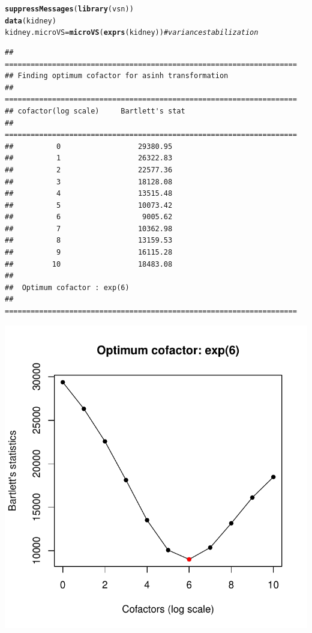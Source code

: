\documentclass{article}\usepackage[]{graphicx}\usepackage[]{color}
\makeatletter
\def\maxwidth{ %
  \ifdim\Gin@nat@width>\linewidth
    \linewidth
  \else
    \Gin@nat@width
  \fi
}
\newcommand{\hlcom}[1]{\textcolor[rgb]{0.678,0.584,0.686}{\textit{#1}}}%
\newcommand{\hlstd}[1]{\textcolor[rgb]{0.345,0.345,0.345}{#1}}%
\newcommand{\hlkwb}[1]{\textcolor[rgb]{0.69,0.353,0.396}{#1}}%
\newcommand{\hlkwd}[1]{\textcolor[rgb]{0.737,0.353,0.396}{\textbf{#1}}}%
\newenvironment{kframe}{%
 \def\at@end@of@kframe{}%
 \ifinner\ifhmode%
  \def\at@end@of@kframe{\end{minipage}}%
  \begin{minipage}{\columnwidth}%
 \fi\fi%
 \def\FrameCommand##1{\hskip\@totalleftmargin \hskip-\fboxsep
 \colorbox{shadecolor}{##1}\hskip-\fboxsep
     \hskip-\linewidth \hskip-\@totalleftmargin \hskip\columnwidth}%
 \MakeFramed {\advance\hsize-\width
   \@totalleftmargin\z@ \linewidth\hsize
   \@setminipage}}%
 {\par\unskip\endMakeFramed%
 \at@end@of@kframe}
\newenvironment{knitrout}{}{} %
\makeatother
\begin{document}
\begin{knitrout}
\color{fgcolor}\begin{kframe}
\begin{alltt}
\hlkwd{suppressMessages}\hlstd{(}\hlkwd{library}\hlstd{(vsn))}
\hlkwd{data}\hlstd{(kidney)}
\hlstd{kidney.microVS} \hlkwb{=} \hlkwd{microVS}\hlstd{(}\hlkwd{exprs}\hlstd{(kidney))} \hlcom{#variance stabilization}
\end{alltt}
\begin{verbatim}
## ====================================================================
## Finding optimum cofactor for asinh transformation
## ====================================================================
## cofactor(log scale)     Bartlett's stat 
## ====================================================================
##          0                  29380.95 
##          1                  26322.83 
##          2                  22577.36 
##          3                  18128.08 
##          4                  13515.48 
##          5                  10073.42 
##          6                   9005.62 
##          7                  10362.98 
##          8                  13159.53 
##          9                  16115.28 
##         10                  18483.08 
## 
##  Optimum cofactor : exp(6) 
## ====================================================================
\end{verbatim}
\end{kframe}
\includegraphics[width=\maxwidth]{figure/microVS-1} 

\end{knitrout}
\end{document}

